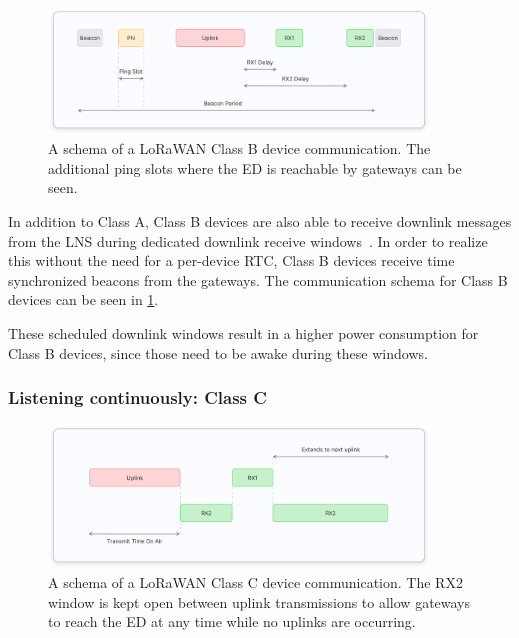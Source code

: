 \begin{figure}[htbp]
    \centering
    \includegraphics[width=0.9\textwidth]{pictures/device-classes/class-b.png}
    \caption{
        A schema of a \ac{LoRaWAN} Class B device communication.
        The additional ping slots where the \acl{ED} is reachable by gateways can be seen.~\protect\cite{the_things_industries_bv_device_nodate}
    }\label{pic:lorawan-device-class-b-schema}
\end{figure}

In addition to Class A, Class B devices are also able to receive downlink messages from the \ac{LNS} during dedicated downlink receive windows~\cite[p. 67]{lora_alliance_inc_lorawan_specification_2017}.
In order to realize this without the need for a per-device \ac{RTC}, Class B devices receive time synchronized beacons from the gateways.
The communication schema for Class B devices can be seen in \cref{pic:lorawan-device-class-b-schema}.

These scheduled downlink windows result in a higher power consumption for Class B devices, since those need to be awake during these windows.

\subsubsection{Listening continuously: Class C}

\begin{figure}[htbp]
    \centering
    \includegraphics[width=0.9\textwidth]{pictures/device-classes/class-c.png}
    \caption{
        A schema of a \ac{LoRaWAN} Class C device communication.
        The RX2 window is kept open between uplink transmissions to allow gateways to reach the \acl{ED} at any time while no uplinks are occurring.~\protect\cite{the_things_industries_bv_device_nodate}
    }\label{pic:lorawan-device-class-c-schema}
\end{figure}

